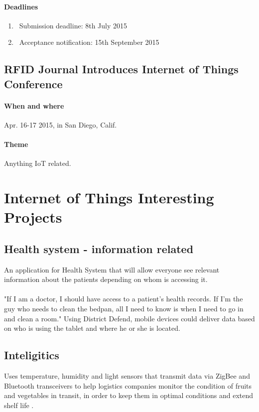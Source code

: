 \documentclass[12pt]{article}
\begin{document}
\paragraph {Deadlines}
\begin{enumerate}
\item\ Submission deadline: 8th July 2015
\item\ Acceptance notification: 15th September 2015

\end{enumerate}

\subsection {RFID Journal Introduces Internet of Things Conference}
\paragraph {When and where} Apr. 16-17 2015, in San Diego, Calif.
\paragraph {Theme} Anything IoT related.

\section{Internet of Things Interesting Projects}

\subsection{Health system - information related} An application for Health System that will allow everyone see relevant information about the patients depending on whom is accessing it.
\paragraph {} "If I am a doctor, I should have access to a patient's health records. If I'm the guy who needs to clean the bedpan, all I need to know is when I need to go in and clean a room." Using District Defend, mobile devices could deliver data based on who is using the tablet and where he or she is located.

 \subsection{Inteligitics} Uses temperature, humidity and light sensors that transmit data via ZigBee and Bluetooth transceivers to help logistics companies monitor the condition of fruits and vegetables in transit, in order to keep them in optimal conditions and extend shelf life \cite{notes}.
\end{document}
